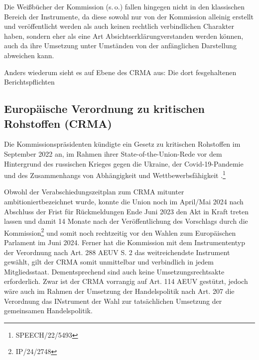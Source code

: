 \documentclass[12pt,a4paper,oneside]{book} %
\begin{document}
	
	
Die Weißbücher der Kommission (s.\,o.) fallen hingegen nicht in den klassischen Bereich der Instrumente, da diese sowohl nur von der Kommission alleinig erstellt und veröffentlicht werden als auch keinen rechtlich verbindlichen Charakter haben, sondern eher als eine Art \glqq Absichtserklärung\grqq verstanden werden können, auch da ihre Umsetzung unter Umständen von der anfänglichen Darstellung abweichen kann.\autocite[siehe hierzu]{Dauses/Ludwigs, O. Umweltrecht, Rn. 196} 
	
Anders wiederum sieht es auf Ebene des CRMA aus: Die dort fesgehaltenen Berichtspflichten
	
\subsection{Europäische Verordnung zu kritischen Rohstoffen (CRMA)}%
Die Kommissionspräsidenten kündigte ein Gesetz zu kritischen Rohstoffen im September 2022 an, im Rahmen ihrer State-of-the-Union-Rede vor dem Hintergrund des russischen Krieges gegen die Ukraine, der Covid-19-Pandemie und des Zusammenhangs von Abhängigkeit und Wettbewerbsfähigkeit .\footnote{SPEECH/22/5493}
	

Obwohl der Verabschiedungszeitplan zum CRMA mitunter \glqq ambitioniert\grqq bezeichnet wurde, konnte die Union noch im April/Mai 2024 nach Abschluss der Frist für Rückmeldungen Ende Juni 2023 den Akt in Kraft treten lassen und damit 14 Monate nach der Veröffentlichung des Vorschlags durch die Kommission\footnote{IP/24/2748} und somit noch rechtzeitig vor den Wahlen zum Europäischen Parlament im Juni 2024. Ferner hat die Kommission mit dem Instrumententyp der Verordnung nach Art. 288 AEUV S. 2 das weitreichendste Instrument gewählt, gilt der CRMA somit unmittelbar und verbindlich in jedem Mitgliedsstaat. Dementsprechend sind auch keine Umsetzungsrechtsakte erforderlich. Zwar ist der CRMA vorrangig auf Art. 114 AEUV gestützt, jedoch wäre auch im Rahmen der Umsetzung der Handelspolitik nach Art. 207 die Verordnung das INstrument der Wahl zur tatsächlichen Umsetzung der gemeinsamen Handelspolitik.\autocite{RdTW 2024, 216}
\end{document}
